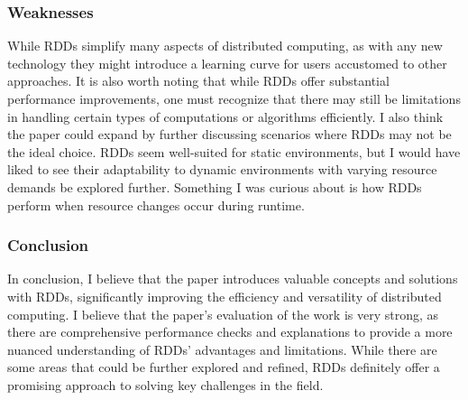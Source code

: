 \documentclass[10pt]{proc}
\begin{document}
\subsubsection{Weaknesses}

While RDDs simplify many aspects of distributed computing, as with any new technology they might introduce a learning curve for users accustomed to other approaches. It is also worth noting that while RDDs offer substantial performance improvements, one must recognize that there may still be limitations in handling certain types of computations or algorithms efficiently. I also think the paper could expand by further discussing scenarios where RDDs may not be the ideal choice. RDDs seem well-suited for static environments, but I would have liked to see their adaptability to dynamic environments with varying resource demands be explored further. Something I was curious about is how RDDs perform when resource changes occur during runtime.

\subsubsection{Conclusion}

In conclusion, I believe that the paper introduces valuable concepts and solutions with RDDs, significantly improving the efficiency and versatility of distributed computing. I believe that the paper's evaluation of the work is very strong, as there are comprehensive performance checks and explanations to provide a more nuanced understanding of RDDs' advantages and limitations. While there are some areas that could be further explored and refined, RDDs definitely offer a promising approach to solving key challenges in the field.



\end{document}
